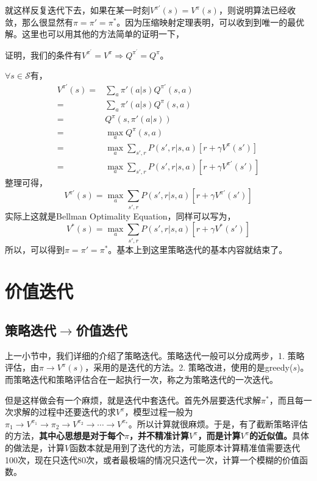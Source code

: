 \documentclass[a4paper]{article}
\begin{document}
就这样反复迭代下去，如果在某一时刻$V^{\pi'}(s) = V^\pi(s)$，则说明算法已经收敛，那么很显然有$\pi = \pi' = \pi^\ast$。因为压缩映射定理表明，可以收到到唯一的最优解。这里也可以用其他的方法简单的证明一下，

证明，我们的条件有$V^{\pi^{\prime}}=V^{\pi} \Rightarrow Q^{\pi^{\prime}}=Q^{\pi}$。

$\forall s\in \mathcal{S}$有，
\begin{equation}
\begin{aligned}
    V^{\pi'}(s) = & \sum_a \pi'(a|s) Q^{\pi'}(s,a)\\
    = & \sum_a \pi'(a|s) Q^{\pi}(s,a) \\
    = & Q^{\pi}(s,\pi'(a|s)) \\
    = & \max_a Q^{\pi}(s,a) \\
    = & \max_a \sum_{s',r} P(s',r|s,a)[r + \gamma V^\pi(s')] \\
    = & \max_a \sum_{s',r} P(s',r|s,a)[r + \gamma V^{\pi'}(s')]
\end{aligned}
\end{equation}
整理可得，
\begin{equation}
    V^{\pi'}(s) = \max_a \sum_{s',r} P(s',r|s,a)[r + \gamma V^{\pi'}(s')]
\end{equation}
实际上这就是Bellman Optimality Equation，同样可以写为，
\begin{equation}
    V^{\ast}(s) = \max_a \sum_{s',r} P(s',r|s,a)[r + \gamma V^{\ast}(s')]
\end{equation}
所以，可以得到$\pi = \pi' = \pi^\ast$。基本上到这里策略迭代的基本内容就结束了。

\section{价值迭代}
\subsection{策略迭代$\to$价值迭代}
上一小节中，我们详细的介绍了策略迭代。策略迭代一般可以分成两步，1. 策略评估，由$\pi \to V^\pi(s)$，采用的是迭代的方法。2. 策略改进，使用的是greedy($s$)。而策略迭代和策略评估合在一起执行一次，称之为策略迭代的一次迭代。

但是这样做会有一个麻烦，就是迭代中套迭代。首先外层要迭代求解$\pi^\ast$，而且每一次求解的过程中还要迭代的求$V^\pi$，模型过程一般为$\pi_1 \to V^{\pi_1} \to \pi_2 \to V^{\pi_2} \to \cdots \to V^{\pi_{\ast}} $。所以计算就很麻烦。于是，有了截断策略评估的方法，\textbf{其中心思想是对于每个$\pi$，并不精准计算$V^\pi$，而是计算$V^\pi$的近似值。}具体的做法是，计算$V$函数本就是用到了迭代的方法，可能原本计算精准值需要迭代100次，现在只迭代80次，或者最极端的情况只迭代一次，计算一个模糊的价值函数。
\end{document}
